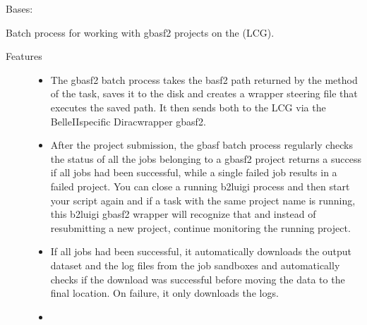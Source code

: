 \documentclass[letterpaper,10pt,english]{sphinxmanual}
\begin{document}
\begin{fulllineitems}
\label{\detokenize{usage/batch:b2luigi.batch.processes.gbasf2.Gbasf2Process}}
Bases: {\hyperref[\detokenize{usage/batch:b2luigi.batch.processes.BatchProcess}]{}}

Batch process for working with gbasf2 projects on the  (LCG).
\begin{description}
\item[{Features}] \leavevmode\begin{itemize}
\item {} 

The gbasf2 batch process takes the basf2 path returned by the 
method of the task, saves it to the disk and creates a wrapper steering file that
executes the saved path. It then sends both to the LCG via
the BelleII\sphinxhyphen{}specific Dirac\sphinxhyphen{}wrapper gbasf2.

\item {} 

After the project submission, the gbasf batch process regularly checks the status
of all the jobs belonging to a gbasf2 project returns a success if
all jobs had been successful, while a single failed job results in a failed project.
You can close a running b2luigi process and then start your script again and if a
task with the same project name is running, this b2luigi gbasf2 wrapper will recognize that
and instead of resubmitting a new project, continue monitoring the running project.

\item {} 

If all jobs had been successful, it automatically downloads the output dataset and
the log files from the job sandboxes and automatically checks if the download was successful
before moving the data to the final location. On failure, it only downloads the logs.

\item {} 


\end{itemize}
\end{description}
\end{fulllineitems}
\end{document}
